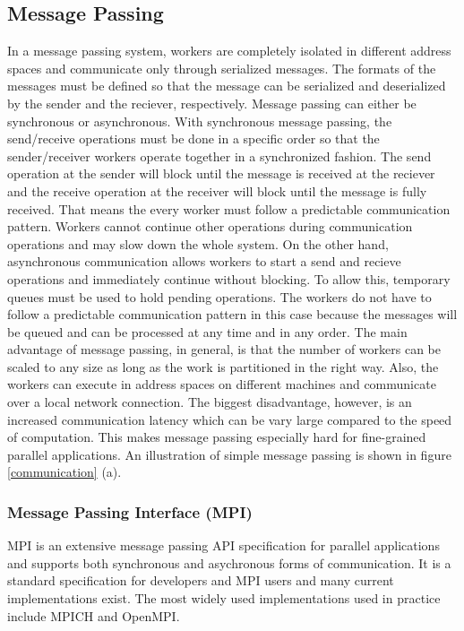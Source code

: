 \documentclass[11pt]{book}
\begin{document}
\subsection{Message Passing}

In a message passing system, workers are completely isolated in different address spaces
and communicate only through serialized messages.  The formats of the messages must be
defined so that the message can be serialized and deserialized by the sender and the reciever,
respectively.  Message passing can either be synchronous or asynchronous.  With synchronous
message passing, the send/receive operations must be done in a specific order so that the
sender/receiver workers operate together in a synchronized fashion.  The send operation at
the sender will block until the message is received at the reciever and the receive operation
at the receiver will block until the message is fully received.  That means the every worker
must follow a predictable communication pattern.  Workers cannot continue other operations
during communication operations and may slow down the whole system.  On the other hand,
asynchronous communication allows workers to start a send and recieve operations and immediately
continue without blocking.  To allow this, temporary queues must be used to hold pending
operations.  The workers do not have to follow a predictable communication pattern in this
case because the messages will be queued and can be processed at any time and in any order.
The main advantage of message passing, in general, is that the number of workers can be scaled
to any size as long as the work is partitioned in the right way.  Also, the workers can execute
in address spaces on different machines and communicate over a local network connection.  The biggest
disadvantage, however, is an increased communication latency which can be vary large compared
to the speed of computation.  This makes message passing especially hard for fine-grained
parallel applications.  An illustration of simple message passing is shown in figure
\ref{communication} (a).

\subsubsection{Message Passing Interface (MPI)}

MPI\cite{Forum:1994:MMI:898758} is an extensive message passing API specification for parallel
applications and supports both synchronous and asychronous forms of communication.  It is
a standard specification for developers and MPI users and many current implementations exist.
The most widely used implementations used in practice include MPICH and OpenMPI.
\end{document}
